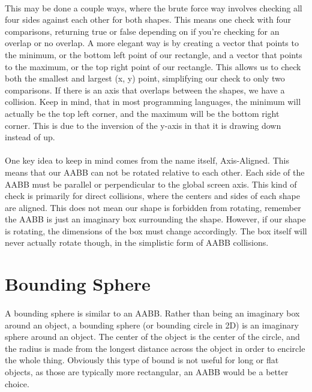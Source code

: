 \documentclass[12pt, letterpaper]{report}
\begin{document}
	\paragraph{}This may be done a couple ways, where the brute force way involves checking all four sides against each other for both shapes. This means one check with four comparisons, returning true or false depending on if you're checking for an overlap or no overlap. A more elegant way is by creating a vector that points to the minimum, or the bottom left point of our rectangle, and a vector that points to the maximum, or the top right point of our rectangle. This allows us to check both the smallest and largest (x, y) point, simplifying our check to only two comparisons. If there is an axis that overlaps between the shapes, we have a collision. Keep in mind, that in most programming languages, the minimum will actually be the top left corner, and the maximum will be the bottom right corner. This is due to the inversion of the y-axis in that it is drawing down instead of up.
	\paragraph{} One key idea to keep in mind comes from the name itself, Axis-Aligned. This means that our AABB can not be rotated relative to each other. Each side of the AABB must be parallel or perpendicular to the global screen axis. This kind of check is primarily for direct collisions, where the centers and sides of each shape are aligned. This does not mean our shape is forbidden from rotating, remember the AABB is just an imaginary box surrounding the shape. However, if our shape is rotating, the dimensions of the box must change accordingly. The box itself will never actually rotate though, in the simplistic form of AABB collisions.
	\section{Bounding Sphere}
	\paragraph{} A bounding sphere is similar to an AABB. Rather than being an imaginary box around an object, a bounding sphere (or bounding circle in 2D) is an imaginary sphere around an object. The center of the object is the center of the circle, and the radius is made from the longest distance across the object in order to encircle the whole thing. Obviously this type of bound is not useful for long or flat objects, as those are typically more rectangular, an AABB would be a better choice. 
\end{document}
